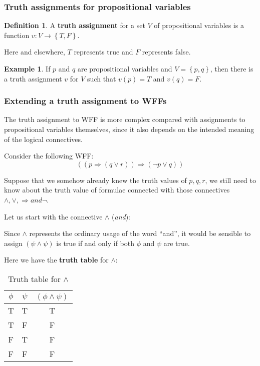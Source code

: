 \documentclass[11pt]{article}
\theoremstyle{definition}
\newtheorem{defn}{Definition}[subsection]
\newtheorem{eg}{Example}[subsection]
\begin{document}
\subsubsection{Truth assignments for propositional variables}
\begin{shaded}
\begin{defn}
    A \textbf{truth assignment} for a set $V$ of propositional variables is a function $v: V \rightarrow \left\{T,F\right\}$.
\end{defn}
\end{shaded}
Here and elsewhere, $T$ represents true and $F$ represents false.
\begin{eg}
    If $p$ and $q$ are propositional variables and $V = \left\{p,q\right\}$, then there is a truth assignment $v$ for $V$ such that $v(p)=T$ and $v(q)=F$.
\end{eg}

\subsubsection{Extending a truth assignment to WFFs}
The truth assignment to WFF is more complex compared with assignments to propositional variables themselves, since it also depends on the intended meaning of the logical connectives.

Consider the following WFF:
\begin{equation}
    ((p \Rightarrow (q \vee r)) \Rightarrow (\neg p \vee q))
\end{equation}

Suppose that we somehow already knew the truth values of $p,q,r$, we still need to know about the truth value of formulae connected with those connectives $\wedge, \vee, \Rightarrow and \neg$.

Let us start with the connective $\wedge$ (\textit{and}):

Since $\wedge$ represents the ordinary usage of the word ``and'', it would be sensible to assign $(\psi \wedge \psi)$ is true if and only if both $\phi$ and $\psi$ are true.

Here we have the \textbf{truth table} for $\wedge$:
\begin{table}[H]
    \centering
    \begin{tabular}{|c|c|c|}
    \hline
    \textbf{$\phi$} & \textbf{$\psi$} & \textbf{$(\phi \wedge \psi)$} \\ \hline
    T          & T          & T          \\ \hline
    T          & F          & F          \\ \hline
    F          & T          & F          \\ \hline
    F          & F          & F          \\ \hline
    \end{tabular}
    \caption[]{Truth table for $\wedge$}
\end{table}
\end{document}
